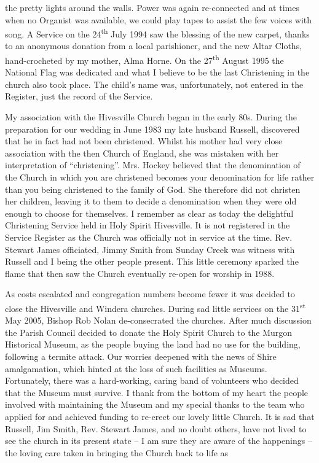 the pretty lights around the walls. Power was again re-connected and at times when no Organist was available, we could play tapes to assist the few voices with song. A Service on the 24\textsuperscript{th} July 1994 saw the blessing of the new carpet, thanks to an anonymous donation from a local parishioner, and the new Altar Cloths, hand-crocheted by my mother, Alma Horne. On the 27\textsuperscript{th} August 1995 the National Flag was dedicated and what I believe to be the last Christening in the church also took place. The child's name was, unfortunately, not entered in the Register, just the record of the Service.



My association with the Hivesville Church began in the early 80s. During the preparation for our wedding in June 1983 my late husband Russell, discovered that he in fact had not been christened. Whilst his mother had very close association with the then Church of England, she was mistaken with her interpretation of ``christening''. Mrs. Hockey believed that the denomination of the Church in which you are christened becomes your denomination for life rather than you being christened to the family of God. She therefore did not christen her children, leaving it to them to decide a denomination when they were old enough to choose for themselves. I remember as clear as today the delightful Christening Service held in Holy Spirit Hivesville. It is not registered in the Service Register as the Church was officially not in service at the time. Rev. Stewart James officiated, Jimmy Smith from Sunday Creek was witness with Russell and I being the other people present. This little ceremony sparked the flame that then saw the Church eventually re-open for worship in 1988.



As costs escalated and congregation numbers become fewer it was decided to close the Hivesville and Windera churches. During sad little services on the 31\textsuperscript{st} May 2005, Bishop Rob Nolan de-consecrated the churches. After much discussion the Parish Council decided to donate the Holy Spirit Church to the Murgon Historical Museum, as the people buying the land had no use for the building, following a termite attack. Our worries deepened with the news of Shire amalgamation, which hinted at the loss of such facilities as Museums. Fortunately, there was a hard-working, caring band of volunteers who decided that the Museum must survive. I thank from the bottom of my heart the people involved with maintaining the Museum and my special thanks to the team who applied for and achieved funding to re-erect our lovely little Church. It is sad that Russell, Jim Smith, Rev. Stewart James, and no doubt others, have not lived to see the church in its present state -- I am sure they are aware of the happenings -- the loving care taken in bringing the Church back to life as



